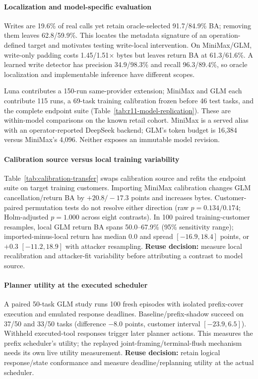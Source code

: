 \paragraph{Localization and model-specific evaluation}
Writes are 19.6\% of real calls yet retain oracle-selected 91.7/84.9\% BA; removing them leaves 62.8/59.9\%. This locates the metadata signature of an operation-defined target and motivates testing write-local intervention. On MiniMax/GLM, write-only padding costs 1.45/1.51$\times$ bytes but leaves return BA at 61.3/61.6\%. A learned write detector has precision 34.9/98.3\% and recall 96.3/89.4\%, so oracle localization and implementable inference have different scopes.

Luna contributes a 150-run same-provider extension; MiniMax and GLM each contribute 115 runs, a 69-task training calibration frozen before 46 test tasks, and the complete endpoint suite (Table~\ref{tab:r11-model-replication}). These are within-model comparisons on the known retail cohort. MiniMax is a served alias with an operator-reported DeepSeek backend; GLM's token budget is 16,384 versus MiniMax's 4,096. Neither exposes an immutable model revision.

\paragraph{Calibration source versus local training variability}
Table~\ref{tab:calibration-transfer} swaps calibration source and refits the endpoint suite on target training customers. Importing MiniMax calibration changes GLM cancellation/return BA by $+20.8/-17.3$ points and increases bytes. Customer-paired permutation tests do not resolve either direction (raw $p=0.134/0.174$; Holm-adjusted $p=1.000$ across eight contrasts). In 100 paired training-customer resamples, local GLM return BA spans 50.0--67.9\% (95\% sensitivity range); imported-minus-local return has median 0.0 and spread $[-16.9,18.4]$ points, or $+0.3$ $[-11.2,18.9]$ with attacker resampling. \textbf{Reuse decision:} measure local recalibration and attacker-fit variability before attributing a contrast to model source.


\paragraph{Planner utility at the executed scheduler}
A paired 50-task GLM study runs 100 fresh episodes with isolated prefix-cover execution and emulated response deadlines. Baseline/prefix-shadow succeed on 37/50 and 33/50 tasks (difference $-8.0$ points, customer interval $[-23.9,6.5]$). Withheld executed-tool responses trigger later planner actions. This measures the prefix scheduler's utility; the replayed joint-framing/terminal-flush mechanism needs its own live utility measurement. \textbf{Reuse decision:} retain logical response/state conformance and measure deadline/replanning utility at the actual scheduler.


